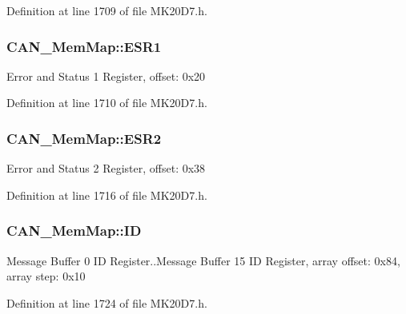 Definition at line 1709 of file M\+K20\+D7.\+h.

\subsubsection[{\texorpdfstring{E\+S\+R1}{ESR1}}]{ C\+A\+N\+\_\+\+Mem\+Map\+::\+E\+S\+R1}\hypertarget{struct_c_a_n___mem_map_a22b3d30edd2510d48809119a334deb5c}{}\label{struct_c_a_n___mem_map_a22b3d30edd2510d48809119a334deb5c}
Error and Status 1 Register, offset\+: 0x20 

Definition at line 1710 of file M\+K20\+D7.\+h.

\subsubsection[{\texorpdfstring{E\+S\+R2}{ESR2}}]{ C\+A\+N\+\_\+\+Mem\+Map\+::\+E\+S\+R2}\hypertarget{struct_c_a_n___mem_map_ac28986f6535a563a5790cdde8b507166}{}\label{struct_c_a_n___mem_map_ac28986f6535a563a5790cdde8b507166}
Error and Status 2 Register, offset\+: 0x38 

Definition at line 1716 of file M\+K20\+D7.\+h.

\subsubsection[{\texorpdfstring{ID}{ID}}]{ C\+A\+N\+\_\+\+Mem\+Map\+::\+ID}\hypertarget{struct_c_a_n___mem_map_a974cc9d286388361bc15ab95bc264671}{}\label{struct_c_a_n___mem_map_a974cc9d286388361bc15ab95bc264671}
Message Buffer 0 ID Register..Message Buffer 15 ID Register, array offset\+: 0x84, array step\+: 0x10 

Definition at line 1724 of file M\+K20\+D7.\+h.

